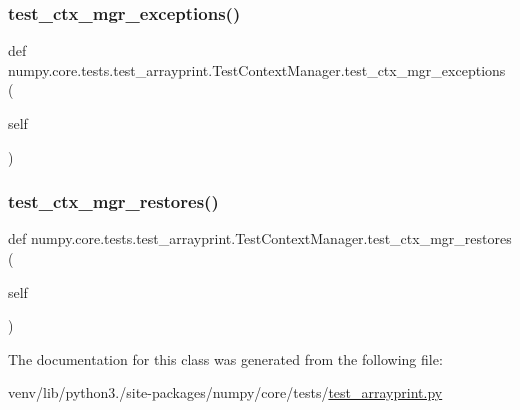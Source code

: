 \subsubsection{\texorpdfstring{test\+\_\+ctx\+\_\+mgr\+\_\+exceptions()}{test\_ctx\_mgr\_exceptions()}}
{\footnotesize\ttfamily def numpy.\+core.\+tests.\+test\+\_\+arrayprint.\+Test\+Context\+Manager.\+test\+\_\+ctx\+\_\+mgr\+\_\+exceptions (\begin{DoxyParamCaption}\item[{}]{self }\end{DoxyParamCaption})}

\mbox{\label{classnumpy_1_1core_1_1tests_1_1test__arrayprint_1_1TestContextManager_a6159e0b601aadedd4e97205a57cc136e}} 
\subsubsection{\texorpdfstring{test\+\_\+ctx\+\_\+mgr\+\_\+restores()}{test\_ctx\_mgr\_restores()}}
{\footnotesize\ttfamily def numpy.\+core.\+tests.\+test\+\_\+arrayprint.\+Test\+Context\+Manager.\+test\+\_\+ctx\+\_\+mgr\+\_\+restores (\begin{DoxyParamCaption}\item[{}]{self }\end{DoxyParamCaption})}



The documentation for this class was generated from the following file\+:\begin{DoxyCompactItemize}
\item 
venv/lib/python3./site-\/packages/numpy/core/tests/\hyperlink{test__arrayprint_8py}{test\+\_\+arrayprint.\+py}\end{DoxyCompactItemize}
